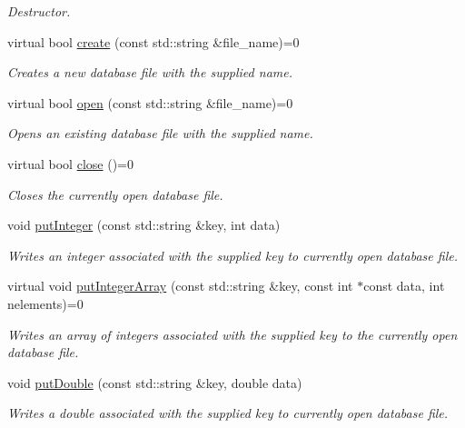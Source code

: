 \begin{DoxyCompactItemize}
\begin{DoxyCompactList}\small\item\em Destructor. \end{DoxyCompactList}\item 
virtual bool \hyperlink{class_c_a_r_o_m_1_1_database_a5399793945da517596be573c47796223}{create} (const std\-::string \&file\-\_\-name)=0
\begin{DoxyCompactList}\small\item\em Creates a new database file with the supplied name. \end{DoxyCompactList}\item 
virtual bool \hyperlink{class_c_a_r_o_m_1_1_database_abc4f4f4e7af7e9b340854d3e7562483e}{open} (const std\-::string \&file\-\_\-name)=0
\begin{DoxyCompactList}\small\item\em Opens an existing database file with the supplied name. \end{DoxyCompactList}\item 
virtual bool \hyperlink{class_c_a_r_o_m_1_1_database_a75da8db9a3ffa8c4c150f67e62a600e8}{close} ()=0
\begin{DoxyCompactList}\small\item\em Closes the currently open database file. \end{DoxyCompactList}\item 
void \hyperlink{class_c_a_r_o_m_1_1_database_ab765fefcca1980db5d65f40fd618986d}{put\-Integer} (const std\-::string \&key, int data)
\begin{DoxyCompactList}\small\item\em Writes an integer associated with the supplied key to currently open database file. \end{DoxyCompactList}\item 
virtual void \hyperlink{class_c_a_r_o_m_1_1_database_a3de6b822f53f16bd8fe8eaff2ce520c3}{put\-Integer\-Array} (const std\-::string \&key, const int $\ast$const data, int nelements)=0
\begin{DoxyCompactList}\small\item\em Writes an array of integers associated with the supplied key to the currently open database file. \end{DoxyCompactList}\item 
void \hyperlink{class_c_a_r_o_m_1_1_database_aac3a202671f838713e8d4b5dc47b2dca}{put\-Double} (const std\-::string \&key, double data)
\begin{DoxyCompactList}\small\item\em Writes a double associated with the supplied key to currently open database file. \end{DoxyCompactList}\item 

\end{DoxyCompactItemize}
